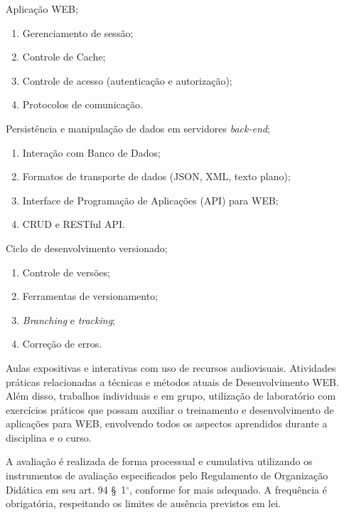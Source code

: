 \begin{pud}
\begin{description}[itemsep=0em]
        \item[UNIDADE II:] Aplicação WEB;
	         \begin{enumerate}[itemsep=0em, topsep=0em]
				\item Gerenciamento de sessão;
				\item Controle de Cache;
				\item Controle de acesso (autenticação e autorização);
				\item Protocolos de comunicação.
            \end{enumerate}
            
         \item[UNIDADE III:] Persistência e manipulação de dados em servidores \textit{back-end};
	         \begin{enumerate}[itemsep=0em, topsep=0em]
				\item Interação com Banco de Dados;
				\item Formatos de transporte de dados (JSON, XML, texto plano);
				\item Interface de Programação de Aplicações (API) para WEB;
				\item CRUD e RESTful API.        
            \end{enumerate}
            
         \item[UNIDADE IV:]  Ciclo de desenvolvimento versionado;
	         \begin{enumerate}[itemsep=0em, topsep=0em]
				\item Controle de versões;
                \item Ferramentas de versionamento;
                \item \textit{Branching} e \textit{tracking};
                \item Correção de erros.
            \end{enumerate}

	\end{description}
	
	
	\metodologia
	Aulas expositivas e interativas com uso de recursos audiovisuais. Atividades práticas relacionadas a técnicas e métodos atuais de Desenvolvimento WEB. Além disso, trabalhos individuais e em grupo, utilização de laboratório com exercícios práticos que possam auxiliar o treinamento e desenvolvimento de aplicações para WEB, envolvendo todos os aspectos aprendidos durante a disciplina e o curso.
	
	\avaliacao
	A avaliação é realizada de forma processual e cumulativa utilizando os instrumentos de avaliação especificados pelo Regulamento de Organização Didática em seu art. 94 \S~1$^\circ$, conforme for mais adequado. A frequência é obrigatória, respeitando os limites de ausência previstos em lei.
	\naopresencial
	

\end{pud}
